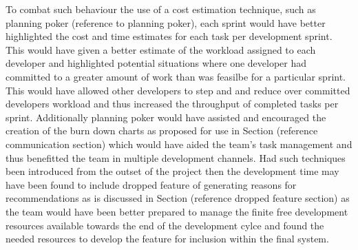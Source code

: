 \documentclass{l3proj}
\begin{document}
To combat such behaviour the use of a cost estimation technique, such as planning poker (reference to planning poker), each sprint would have better highlighted the cost and time estimates for each task per development sprint. This would have given a better estimate of the workload assigned to each developer and highlighted potential situations where one developer had committed to a greater amount of work than was feasilbe for a particular sprint. This would have allowed other developers to step and and reduce over committed developers workload and thus increased the throughput of completed tasks per sprint. Additionally planning poker would have assisted and encouraged the creation of the burn down charts as proposed for use in Section (reference communication section) which would have aided the team's task management and thus benefitted the team in multiple development channels. Had such techniques been introduced from the outset of the project then the development time may have been found to include dropped feature of generating reasons for recommendations as is discussed in Section (reference dropped feature section) as the team would have been better prepared to manage the finite free development resources available towards the end of the development cylce and found the needed resources to develop the feature for inclusion within the final system. 
\end{document}
